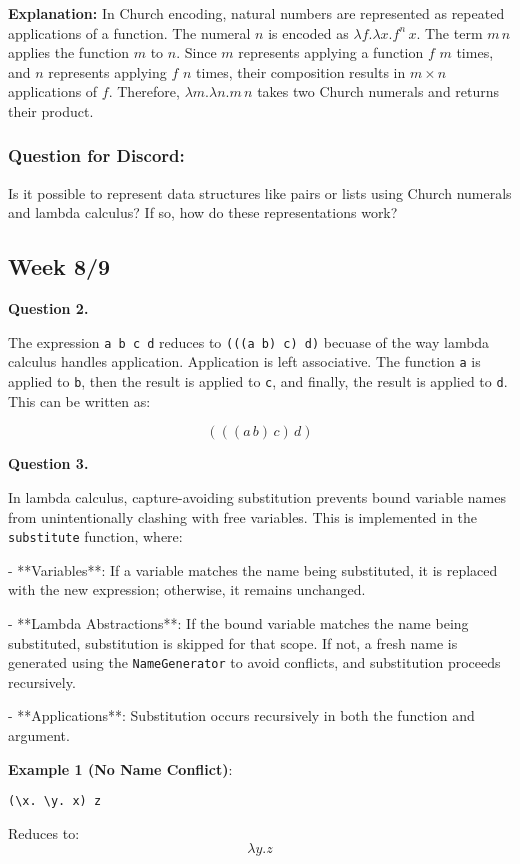 \documentclass{article}
\theoremstyle{theorem}
\theoremstyle{definition}
\theoremstyle{remark}
\begin{document}
\textbf{Explanation:}
In Church encoding, natural numbers are represented as repeated applications of a function. The numeral $n$ is encoded as $\lambda f.\lambda x.f^n\,x$. The term $m\,n$ applies the function $m$ to $n$. Since $m$ represents applying a function $f$ $m$ times, and $n$ represents applying $f$ $n$ times, their composition results in $m \times n$ applications of $f$. Therefore, $\lambda m.\lambda n.m\,n$ takes two Church numerals and returns their product.

\subsubsection*{Question for Discord:}
Is it possible to represent data structures like pairs or lists using Church numerals and lambda calculus? If so, how do these representations work?

\subsection{Week 8/9}


\textbf{Question 2.}

The expression \texttt{a b c d} reduces to \texttt{(((a b) c) d)} becuase of the way lambda calculus handles application. Application is left associative. The function \texttt{a} is applied to \texttt{b}, then the result is applied to \texttt{c}, and finally, the result is applied to \texttt{d}. This can be written as:

\[
 (((a \, b) \, c) \, d)
\]

\textbf{Question 3.}

In lambda calculus, capture-avoiding substitution prevents bound variable names from unintentionally clashing with free variables. This is implemented in the \texttt{substitute} function, where:

- **Variables**: If a variable matches the name being substituted, it is replaced with the new expression; otherwise, it remains unchanged.

- **Lambda Abstractions**: If the bound variable matches the name being substituted, substitution is skipped for that scope. If not, a fresh name is generated using the \texttt{NameGenerator} to avoid conflicts, and substitution proceeds recursively.

- **Applications**: Substitution occurs recursively in both the function and argument.

\textbf{Example 1 (No Name Conflict)}:
\begin{verbatim}
(\x. \y. x) z
\end{verbatim}
Reduces to: 
\[
\lambda y. z
\]
\end{document}
